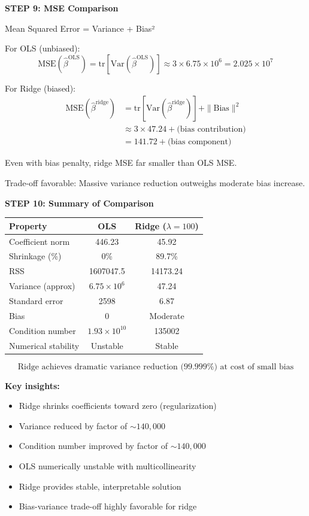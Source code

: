 \documentclass[12pt]{article}
\begin{document}
\begin{solution}
\textbf{STEP 9: MSE Comparison}

Mean Squared Error = Variance + Bias²

For OLS (unbiased):
\[\text{MSE}(\hat{\beta}^{\text{OLS}}) = \text{tr}[\text{Var}(\hat{\beta}^{\text{OLS}})] \approx 3 \times 6.75 \times 10^{6} = 2.025 \times 10^{7}\]

For Ridge (biased):
\begin{align*}
\text{MSE}(\hat{\beta}^{\text{ridge}}) &= \text{tr}[\text{Var}(\hat{\beta}^{\text{ridge}})] + \|\text{Bias}\|^2 \\
&\approx 3 \times 47.24 + \text{(bias contribution)} \\
&= 141.72 + \text{(bias component)}
\end{align*}

Even with bias penalty, ridge MSE far smaller than OLS MSE.

Trade-off favorable: Massive variance reduction outweighs moderate bias increase.

\textbf{STEP 10: Summary of Comparison}

\begin{center}
\begin{tabular}{lcc}
\hline
Property & OLS & Ridge ($\lambda=100$) \\
\hline
Coefficient norm & 446.23 & 45.92 \\
Shrinkage (\%) & 0\% & 89.7\% \\
RSS & 1607047.5 & 14173.24 \\
Variance (approx) & $6.75 \times 10^{6}$ & 47.24 \\
Standard error & 2598 & 6.87 \\
Bias & 0 & Moderate \\
Condition number & $1.93 \times 10^{10}$ & 135002 \\
Numerical stability & Unstable & Stable \\
\hline
\end{tabular}
\end{center}

\[\boxed{\text{Ridge achieves dramatic variance reduction (99.999\%) at cost of small bias}}\]

\textbf{Key insights:}
\begin{itemize}
\item Ridge shrinks coefficients toward zero (regularization)
\item Variance reduced by factor of $\sim 140{,}000$
\item Condition number improved by factor of $\sim 140{,}000$
\item OLS numerically unstable with multicollinearity
\item Ridge provides stable, interpretable solution
\item Bias-variance trade-off highly favorable for ridge
\end{itemize}

\end{solution}
\end{document}
